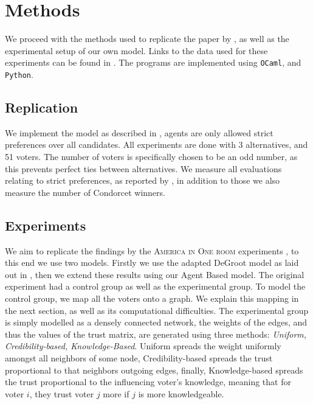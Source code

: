 \chapter{Methods}
\label{Methods}

We proceed with the methods used to replicate the paper by \citet{radDeliberationSinglePeakednessCoherent2021}, as well as the experimental setup of our own model. Links to the data used for these experiments can be found in . The programs are implemented using \texttt{OCaml}, and \texttt{Python}.


\section{Replication}
We implement the model as described in , agents are only allowed strict preferences over all candidates. All experiments are done with 3 alternatives, and 51 voters. The number of voters is specifically chosen to be an odd number, as this prevents perfect ties between alternatives. We measure all evaluations relating to strict preferences, as reported by \citet{radDeliberationSinglePeakednessCoherent2021}, in addition to those we also measure the number of Condorcet winners.

\section{Experiments}
We aim to replicate the findings by the \textsc{America in One room} experiments \cite{fishkinCanDeliberationHave2024}, to this end we use two models. Firstly we use the adapted DeGroot model as laid out in , then we extend these results using our Agent Based model. The original experiment had a control group as well as the experimental group. To model the control group, we map all the voters onto a graph. We explain this mapping in the next section, as well as its computational difficulties. The experimental group is simply modelled as a densely connected network, the weights of the edges, and thus the values of the trust matrix, are generated using three methods: \textit{Uniform, Credibility-based, Knowledge-Based}. Uniform spreads the weight uniformly amongst all neighbors of some node, Credibility-based spreads the trust proportional to that neighbors outgoing edges, finally, Knowledge-based spreads the trust proportional to the influencing voter's knowledge, meaning that for voter $i$, they trust voter $j$ more if $j$ is more knowledgeable.

